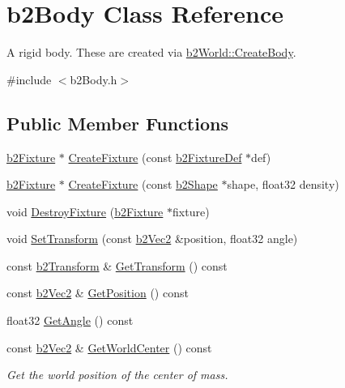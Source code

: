 \hypertarget{classb2Body}{}\section{b2\+Body Class Reference}
\label{classb2Body}


A rigid body. These are created via \hyperlink{classb2World_a2eb36e967e43294bfa03ec3d177c2dae}{b2\+World\+::\+Create\+Body}.  




{\ttfamily \#include $<$b2\+Body.\+h$>$}

\subsection*{Public Member Functions}
\begin{DoxyCompactItemize}
\item 
\hyperlink{classb2Fixture}{b2\+Fixture} $\ast$ \hyperlink{classb2Body_aa4892301e9b9d62ede5e93dad1743894}{Create\+Fixture} (const \hyperlink{structb2FixtureDef}{b2\+Fixture\+Def} $\ast$def)
\item 
\hyperlink{classb2Fixture}{b2\+Fixture} $\ast$ \hyperlink{classb2Body_a52d971867086d5db79769a62bbb70a60}{Create\+Fixture} (const \hyperlink{classb2Shape}{b2\+Shape} $\ast$shape, float32 density)
\item 
void \hyperlink{classb2Body_a856d1df86b7bded91f02d8cfcaea1c2f}{Destroy\+Fixture} (\hyperlink{classb2Fixture}{b2\+Fixture} $\ast$fixture)
\item 
void \hyperlink{classb2Body_a4686f32bbce5723761e9719c706eca11}{Set\+Transform} (const \hyperlink{structb2Vec2}{b2\+Vec2} \&position, float32 angle)
\item 
const \hyperlink{structb2Transform}{b2\+Transform} \& \hyperlink{classb2Body_afb316448e6e555ceb2df23ed216b2f53}{Get\+Transform} () const
\item 
const \hyperlink{structb2Vec2}{b2\+Vec2} \& \hyperlink{classb2Body_a7944dc953ac0cb1e00b32bc61b50e70d}{Get\+Position} () const
\item 
float32 \hyperlink{classb2Body_a20b9c8d0d722edf3af281034d37bd534}{Get\+Angle} () const
\item 
\mbox{\label{classb2Body_a3e14cfe61c63913ef7b0f719f7145318}} 
const \hyperlink{structb2Vec2}{b2\+Vec2} \& \hyperlink{classb2Body_a3e14cfe61c63913ef7b0f719f7145318}{Get\+World\+Center} () const
\begin{DoxyCompactList}\small\item\em Get the world position of the center of mass. \end{DoxyCompactList}\item 

\end{DoxyCompactItemize}
